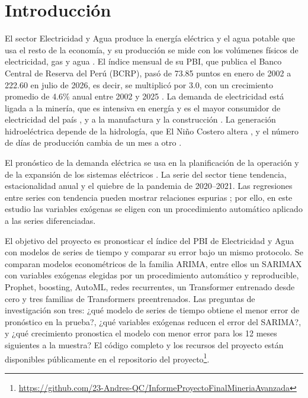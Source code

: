 \documentclass[conference]{IEEEtran}
\begin{document}
\section{Introducción}

El sector Electricidad y Agua produce la energía eléctrica y el agua potable que usa el resto de la economía, y su producción se mide con los volúmenes físicos de electricidad, gas y agua \cite{inei2017}. El índice mensual de su PBI, que publica el Banco Central de Reserva del Perú (BCRP), pasó de 73.85 puntos en enero de 2002 a 222.60 en julio de 2026, es decir, se multiplicó por 3.0, con un crecimiento promedio de 4.6\% anual entre 2002 y 2025 \cite{bcrpdata}. La demanda de electricidad está ligada a la minería, que es intensiva en energía y es el mayor consumidor de electricidad del país \cite{norgate2010,bcrp_moneda198}, y a la manufactura y la construcción \cite{peralta2021}. La generación hidroeléctrica depende de la hidrología, que El Niño Costero altera \cite{lavado2013,takahashi2015}, y el número de días de producción cambia de un mes a otro \cite{bell1983,hong2016}.

El pronóstico de la demanda eléctrica se usa en la planificación de la operación y de la expansión de los sistemas eléctricos \cite{hong2016}. La serie del sector tiene tendencia, estacionalidad anual y el quiebre de la pandemia de 2020--2021. Las regresiones entre series con tendencia pueden mostrar relaciones espurias \cite{granger1974}; por ello, en este estudio las variables exógenas se eligen con un procedimiento automático aplicado a las series diferenciadas.

El objetivo del proyecto es pronosticar el índice del PBI de Electricidad y Agua con modelos de series de tiempo y comparar su error bajo un mismo protocolo. Se comparan modelos econométricos de la familia ARIMA, entre ellos un SARIMAX con variables exógenas elegidas por un procedimiento automático y reproducible, Prophet, boosting, AutoML, redes recurrentes, un Transformer entrenado desde cero y tres familias de Transformers preentrenados. Las preguntas de investigación son tres: ¿qué modelo de series de tiempo obtiene el menor error de pronóstico en la prueba?, ¿qué variables exógenas reducen el error del SARIMA?, y ¿qué crecimiento pronostica el modelo con menor error para los 12 meses siguientes a la muestra? El código completo y los recursos del proyecto están disponibles públicamente en el repositorio del proyecto\footnote{\url{https://github.com/23-Andres-QC/InformeProyectoFinalMineriaAvanzada}}.
\end{document}
